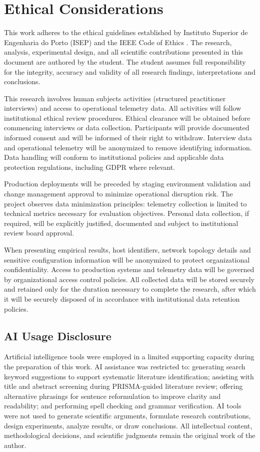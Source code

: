 \section{Ethical Considerations}
This work adheres to the ethical guidelines established by Instituto Superior de Engenharia do Porto (\ac{ISEP}) and the IEEE Code of Ethics \parencite{IEEEXploreFullText}. The research, analysis, experimental design, and all scientific contributions presented in this document are authored by the student. The student assumes full responsibility for the integrity, accuracy and validity of all research findings, interpretations and conclusions.

This research involves human subjects activities (structured practitioner interviews) and access to operational telemetry data. All activities will follow institutional ethical review procedures. Ethical clearance will be obtained before commencing interviews or data collection. Participants will provide documented informed consent and will be informed of their right to withdraw. Interview data and operational telemetry will be anonymized to remove identifying information. Data handling will conform to institutional policies and applicable data protection regulations, including GDPR where relevant.

Production deployments will be preceded by staging environment validation and change management approval to minimize operational disruption risk. The project observes data minimization principles: telemetry collection is limited to technical metrics necessary for evaluation objectives. Personal data collection, if required, will be explicitly justified, documented and subject to institutional review board approval.

When presenting empirical results, host identifiers, network topology details and sensitive configuration information will be anonymized to protect organizational confidentiality. Access to production systems and telemetry data will be governed by organizational access control policies. All collected data will be stored securely and retained only for the duration necessary to complete the research, after which it will be securely disposed of in accordance with institutional data retention policies.

\subsection{AI Usage Disclosure}
Artificial intelligence tools were employed in a limited supporting capacity during the preparation of this work. AI assistance was restricted to: generating search keyword suggestions to support systematic literature identification; assisting with title and abstract screening during PRISMA-guided literature review; offering alternative phrasings for sentence reformulation to improve clarity and readability; and performing spell checking and grammar verification. AI tools were not used to generate scientific arguments, formulate research contributions, design experiments, analyze results, or draw conclusions. All intellectual content, methodological decisions, and scientific judgments remain the original work of the author.

